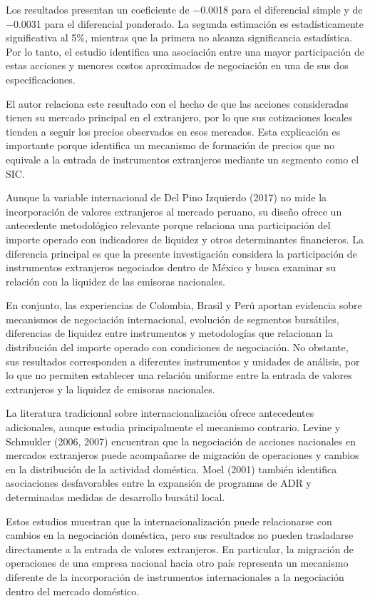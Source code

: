 Los resultados presentan un coeficiente de $-$0.0018 para el diferencial simple y de $-$0.0031 para el diferencial ponderado. La segunda estimación es estadísticamente significativa al 5\%, mientras que la primera no alcanza significancia estadística. Por lo tanto, el estudio identifica una asociación entre una mayor participación de estas acciones y menores costos aproximados de negociación en una de sus dos especificaciones.

El autor relaciona este resultado con el hecho de que las acciones consideradas tienen su mercado principal en el extranjero, por lo que sus cotizaciones locales tienden a seguir los precios observados en esos mercados. Esta explicación es importante porque identifica un mecanismo de formación de precios que no equivale a la entrada de instrumentos extranjeros mediante un segmento como el SIC.

Aunque la variable internacional de Del Pino Izquierdo (2017) no mide la incorporación de valores extranjeros al mercado peruano, su diseño ofrece un antecedente metodológico relevante porque relaciona una participación del importe operado con indicadores de liquidez y otros determinantes financieros. La diferencia principal es que la presente investigación considera la participación de instrumentos extranjeros negociados dentro de México y busca examinar su relación con la liquidez de las emisoras nacionales.

En conjunto, las experiencias de Colombia, Brasil y Perú aportan evidencia sobre mecanismos de negociación internacional, evolución de segmentos bursátiles, diferencias de liquidez entre instrumentos y metodologías que relacionan la distribución del importe operado con condiciones de negociación. No obstante, sus resultados corresponden a diferentes instrumentos y unidades de análisis, por lo que no permiten establecer una relación uniforme entre la entrada de valores extranjeros y la liquidez de emisoras nacionales.

La literatura tradicional sobre internacionalización ofrece antecedentes adicionales, aunque estudia principalmente el mecanismo contrario. Levine y Schmukler (2006, 2007) encuentran que la negociación de acciones nacionales en mercados extranjeros puede acompañarse de migración de operaciones y cambios en la distribución de la actividad doméstica. Moel (2001) también identifica asociaciones desfavorables entre la expansión de programas de ADR y determinadas medidas de desarrollo bursátil local.

Estos estudios muestran que la internacionalización puede relacionarse con cambios en la negociación doméstica, pero sus resultados no pueden trasladarse directamente a la entrada de valores extranjeros. En particular, la migración de operaciones de una empresa nacional hacia otro país representa un mecanismo diferente de la incorporación de instrumentos internacionales a la negociación dentro del mercado doméstico.

